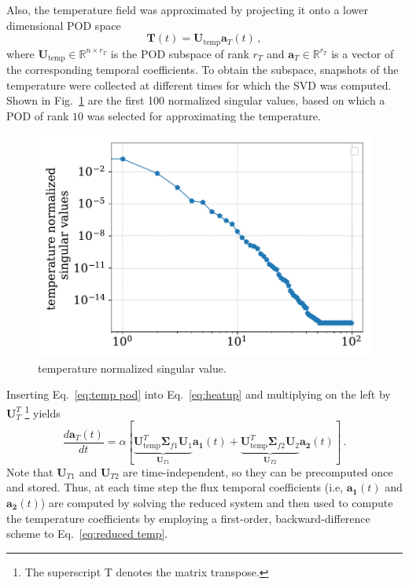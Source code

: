 \documentclass[]{interact}
\theoremstyle{plain}%
\theoremstyle{definition}
\theoremstyle{remark}
\begin{document}
Also, the temperature field was approximated by projecting it onto a lower dimensional POD space
\begin{equation}
\mathbf{T}(t) = \mathbf{U}_{\text{temp}}\mathbf{a}_T(t) \, ,
\label{eq:temp pod}
\end{equation}
where $\mathbf{U}_{\text{temp}}\in\mathbb{R}^{n \times r_T} $ is the POD subspace of rank $r_T$ and $\mathbf{a}_T\in \mathbb{R}^{r_T}$ is a vector of the corresponding temporal coefficients. 
To obtain the subspace, snapshots of the temperature were collected at different times for which the SVD was computed.
Shown in Fig.~\ref{fig:lra T singular values} are the first 100 normalized singular values, based on which a POD of rank $10$ was selected for approximating the temperature.
\begin{figure}[H]
	\centering
	\includegraphics[width=1.0\linewidth]{../figures/LRA_T_singular_values.pdf}
	\caption{temperature normalized singular value.}
	\label{fig:lra T singular values}
\end{figure}
Inserting Eq.~\ref{eq:temp pod} into Eq.~\ref{eq:heatup} and multiplying on the left by $\mathbf{U}_T^T$ \footnote{The superscript T denotes the matrix transpose.} yields
\begin{equation}
\frac{d\mathbf{a}_T(t)}{dt}  = \alpha [\underbrace{\mathbf{U}_{\text{temp}}^T \boldsymbol{\Sigma}_{f1}\mathbf{U}_1}_{\mathbf{U}_{T1}}\mathbf{a_1}(t) + \underbrace{\mathbf{U}_{\text{temp}}^T\boldsymbol{\Sigma}_{f2}\mathbf{U}_2}_{\mathbf{U}_{T2}}\mathbf{a_2}(t)] \, .
\label{eq:reduced temp}
\end{equation}
Note that $\mathbf{U}_{T1}$ and $\mathbf{U}_{T2}$ are time-independent, so they can be precomputed once and stored.
Thus, at each time step the flux temporal coefficients (i.e, $\mathbf{a_1}(t)$ and $\mathbf{a_2}(t)$) are computed by solving the reduced system and then used to compute the temperature coefficients by employing a first-order, backward-difference scheme to Eq.~\ref{eq:reduced temp}.
\end{document}
